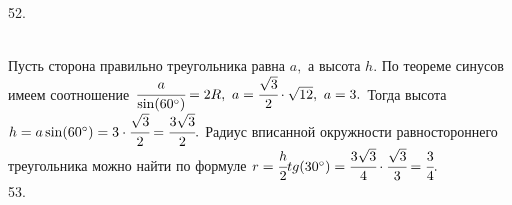 \documentclass[12pt]{article}
\begin{document}
52. \begin{figure}[ht!]
\end{figure}\\
Пусть сторона правильно треугольника равна $a,$ а высота $h.$ По теореме синусов имеем соотношение $\cfrac{a}{\sin(60^\circ)}=2R,\ a=\cfrac{\sqrt{3}}{2}\cdot\sqrt{12},\ a=3.$ Тогда высота $h=a\sin(60^\circ)=3\cdot\cfrac{\sqrt{3}}{2}=\cfrac{3\sqrt{3}}{2}.$ Радиус вписанной окружности равностороннего треугольника можно найти по формуле $r=\cfrac{h}{2}tg(30^\circ)=\cfrac{3\sqrt{3}}{4}\cdot\cfrac{\sqrt{3}}{3}=\cfrac{3}{4}.$\\
53. \begin{figure}[ht!]
\end{figure}\\
\end{document}
